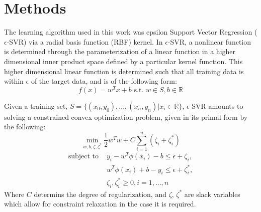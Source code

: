\documentclass[12]{article}
\begin{document}
\section*{Methods}

The learning algorithm used in this work was epsilon Support Vector Regression
($\epsilon$-SVR) via a radial basis function (RBF) kernel. In $\epsilon$-SVR, 
a nonlinear function is determined through the parameterization of a linear 
function in a higher dimensional inner product space defined by a particular 
kernel function. This higher dimensional linear function is determined such 
that all training data is within $\epsilon$ of the target data, and is of the 
following form: \\
\begin{equation*}
f(x) = w^Tx + b \mbox{ s.t. } w \in S, b \in \mathbb{R}
\end{equation*}

Given a training set, $S = \{(x_0,y_0), ..., (x_n,y_n) | x_i \in \mathbb{R}\}$, 
$\epsilon$-SVR amounts to solving a constrained convex optimization problem, 
given in its primal form by the following:
\begin{equation*}
\min_{w, b, \zeta, \zeta^*} \frac{1}{2} w^T w + C \sum_{i=1}^{n} (\zeta_i + \zeta_i^*)
\end{equation*}
\begin{align*}
\mbox{subject to } & y_i - w^T \phi (x_i) - b \leq \epsilon + \zeta_i, \\
& w^T \phi (x_i) + b - y_i \leq \epsilon + \zeta_i^*, \\
& \zeta_i, \zeta_i^* \geq 0, i=1,...,n
\end{align*}
Where $C$ determins the degree of regularization, and $\zeta$, $\zeta^*$ are
slack variables which allow for constraint relaxation in the case it is
required.
\end{document}
